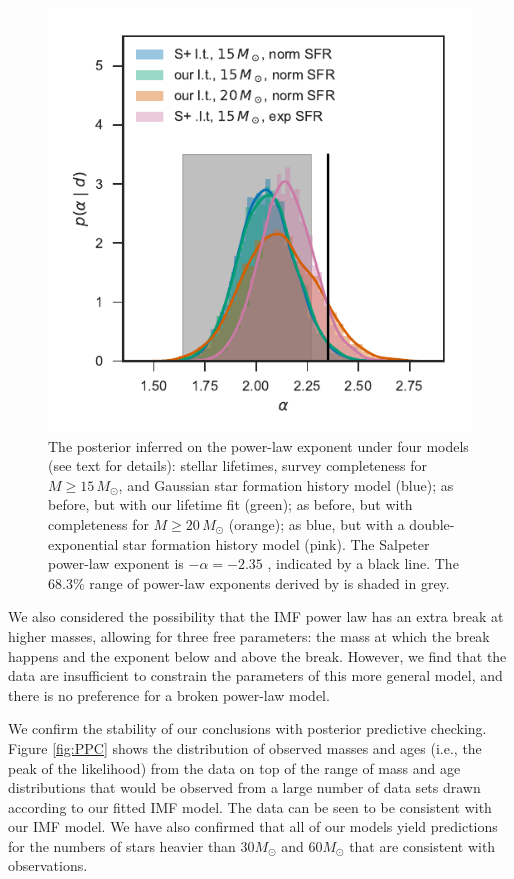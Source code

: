 \documentclass[apjl]{emulateapj}
\newcommand{\MSun}{M_\odot}
\begin{document}
\begin{figure}
\includegraphics[width=\columnwidth]{alpha.pdf}
    		\caption{The posterior inferred on the power-law exponent under four models (see text for details): \citet{Schneider:2018} stellar lifetimes, survey completeness for $M \geq 15 \, \MSun$, and Gaussian star formation history model (blue); as before, but with our lifetime fit (green); as before, but with completeness for $M \geq 20 \, \MSun$ (orange); as blue, but with a double-exponential star formation history model (pink).  The Salpeter power-law exponent is $-\alpha=-2.35$ \citep{Salpeter:1955}, indicated by a black line.  The 68.3\% range of power-law exponents derived by \citet{Schneider:2018} is shaded in grey. }\label{fig:IMF}
\end{figure}

We also considered the possibility that the IMF power law has an extra break at higher masses, allowing for three free parameters: the mass at which the break happens and the exponent below and above the break.  However, we find that the data are insufficient to constrain the parameters of this more general model, and there is no preference for a broken power-law model. 

We confirm the stability of our conclusions with posterior predictive checking.
Figure \ref{fig:PPC} shows the distribution of observed masses and ages (i.e.,
the peak of the likelihood) from the \citet{Schneider:2018} data on top of the
range of mass and age distributions that would be observed from a large number
of data sets drawn according to our fitted IMF model.  The data can be seen to
be consistent with our IMF model.  We have also confirmed that all of our models yield predictions for the numbers of stars heavier than $30 M_\odot$ and $60 M_\odot$ that are consistent with observations.
\end{document}
